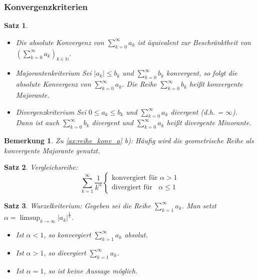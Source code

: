 \documentclass[12pt,a4paper]{article}%
\newtheorem{satz}{Satz}[section]
\newtheorem{bem}{Bemerkung}[section]
\numberwithin{equation}{section}
\newcommand{\N}{\mathbb{N}}
\numberwithin{equation}{subsection}
\begin{document}
	  \subsubsection{Konvergenzkriterien}
	  \begin{satz}
	    \begin{itemize}
	      \item[a) ] Die absolute Konvergenz von $\sum\limits_{k=0}^\infty a_k$ ist äquivalent zur Beschränktheit von $\left(\sum\limits_{k=0}^\infty a_k \right)_{k\in \N}$.
	      \item[b) ] Majorantenkriterium \newline
	      Sei $|a_k| \leq b_k$ und $\sum\limits_{k=0}^\infty b_k$ konvergent, so folgt die absolute Konvergenz von $\sum\limits_{k=0}^\infty a_k$. Die Reihe $\sum\limits_{k=0}^\infty b_k$ heißt konvergente Majorante. 
	      \item[c) ] Divergenzkriterium \newline
	      Sei $0 \leq a_k \leq b_k$ und $\sum\limits_{k=0}^\infty a_k$ divergent (d.h. = $\infty$). Dann ist auch $\sum\limits_{k=0}^\infty b_k$ divergent und $\sum\limits_{k=0}^\infty a_k$ heißt divergente Minorante.
	    \end{itemize} \label{ax:reihe_konv_a}
	  \end{satz}
	  \begin{bem}
	    Zu \eqref{ax:reihe_konv_a} b): Häufig wird die geometrische Reihe als konvergente Majorante genutzt.
	  \end{bem}
	  \begin{satz}
	    Vergleichsreihe:
	    \begin{equation}
	      \sum\limits_{k = 1}^\infty \frac{1}{k^\alpha} 
	      \begin{cases}
	        \text{konvergiert für }\alpha > 1 \\
	        \text{divergiert für  }\;\;\alpha \leq 1
	      \end{cases}
	    \end{equation}
	  \end{satz}
	  \begin{satz}
	    Wurzelkriterium: Gegeben sei die Reihe $\sum\limits_{k=1}^\infty a_k$. Man setzt $\alpha = \limsup_{k \rightarrow \infty} |a_k|^{\frac{1}{k}}$.
	    \begin{itemize}
	      \item[a) ] Ist $\alpha < 1$, so konvergiert $\sum\limits_{k=1}^\infty a_k$ absolut.
	      \item[b) ] Ist $\alpha > 1$, so divergiert $\sum\limits_{k=1}^\infty a_k$.
	      \item[c) ] Ist $\alpha = 1$, so ist keine Aussage möglich.
	    \end{itemize}\label{ax:folgen_konv_wurzel}
	  \end{satz}
\end{document}
